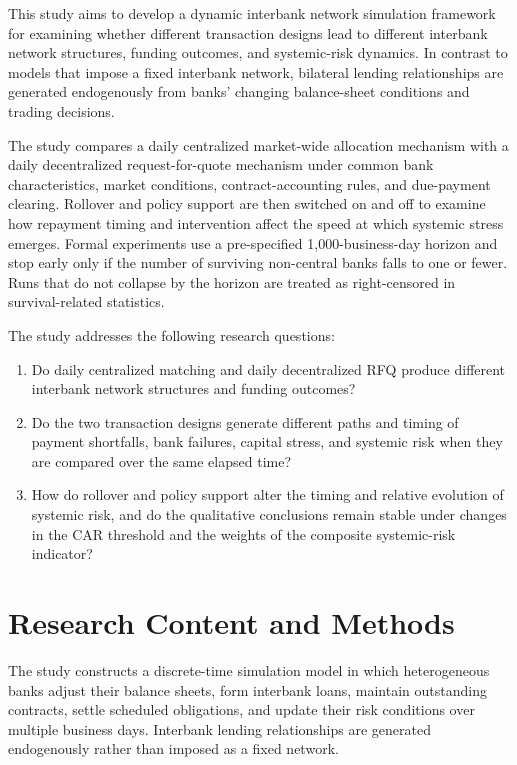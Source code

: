 This study aims to develop a dynamic interbank network simulation
framework for examining whether different transaction designs lead to
different interbank network structures, funding outcomes, and
systemic-risk dynamics. In contrast to models that impose a fixed
interbank network, bilateral lending relationships are generated
endogenously from banks' changing balance-sheet conditions and trading
decisions.

The study compares a daily centralized market-wide allocation mechanism
with a daily decentralized request-for-quote mechanism under common bank
characteristics, market conditions, contract-accounting rules, and
due-payment clearing. Rollover and policy support are then switched on
and off to examine how repayment timing and intervention affect the
speed at which systemic stress emerges. Formal experiments use a
pre-specified 1,000-business-day horizon and stop early only if the number
of surviving non-central banks falls to one or fewer. Runs that do not
collapse by the horizon are treated as right-censored in survival-related
statistics.

The study addresses the following research questions:

\begin{enumerate}
\def\labelenumi{\arabic{enumi}.}
\item
  Do daily centralized matching and daily decentralized RFQ produce
  different interbank network structures and funding outcomes?
\item
  Do the two transaction designs generate different paths and timing of
  payment shortfalls, bank failures, capital stress, and systemic risk
  when they are compared over the same elapsed time?
\item
  How do rollover and policy support alter the timing and relative
  evolution of systemic risk, and do the qualitative conclusions remain
  stable under changes in the CAR threshold and the weights of the
  composite systemic-risk indicator?
\end{enumerate}

\section{Research Content and Methods}

The study constructs a discrete-time simulation model in which
heterogeneous banks adjust their balance sheets, form interbank loans,
maintain outstanding contracts, settle scheduled obligations, and update
their risk conditions over multiple business days. Interbank lending
relationships are generated endogenously rather than imposed as a fixed
network.

